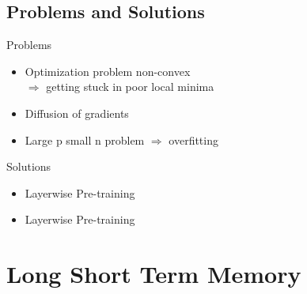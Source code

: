 	
	\subsection{Problems and Solutions}
	\begin{frame}[t]{Problems}
		\begin{itemize}
			\item Optimization problem non-convex\\
			$\Rightarrow$ getting stuck in poor local minima
			\item Diffusion of gradients
			\item Large p small n problem $\Rightarrow$ overfitting
	
	\end{itemize}

	\end{frame}
	\begin{frame}[t]{Solutions}
		\begin{minipage}[h]{0.48\linewidth}
			\begin{itemize}
				\item Layerwise Pre-training
			\end{itemize}
		\end{minipage}\hfill
		\begin{minipage}[h]{0.48\linewidth}
			\begin{itemize}
				\item Layerwise Pre-training
			\end{itemize}
		\end{minipage}		
	\end{frame}

\section{Long Short Term Memory}

